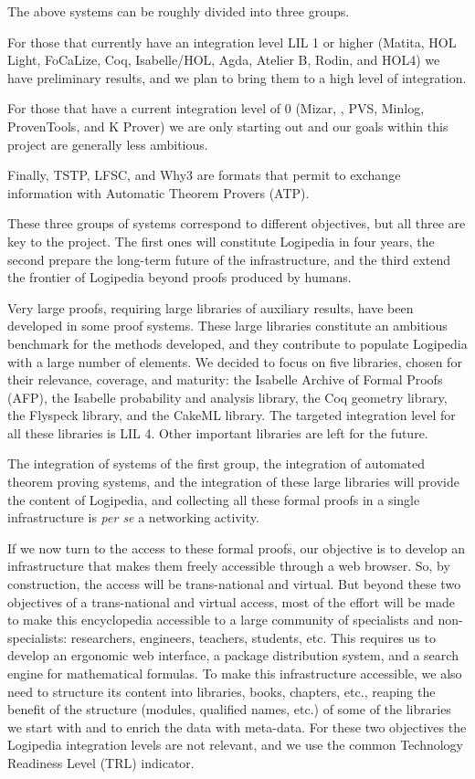 The above systems can be roughly divided into three groups.
\begin{compactitem}
\item For those
that currently have an integration level LIL 1 or higher (Matita, HOL
Light, FoCaLize, Coq, Isabelle/HOL, Agda, Atelier B, Rodin, and HOL4)
we have preliminary results, and we plan to bring them to a high level
of integration.
\item For those that have a current integration level of 0
(Mizar, \tlaplus, PVS, Minlog, ProvenTools, and K Prover) we are only
starting out and our goals within this project are generally less
ambitious.
\item Finally, TSTP, LFSC, and Why3 are formats that permit
to exchange information with Automatic Theorem Provers (ATP).
\end{compactitem}
These three groups of systems correspond to different
objectives, but all three are key to the project. The first ones will
constitute Logipedia in four years, the second prepare the
long-term future of the infrastructure, and the third extend the
frontier of Logipedia beyond proofs produced by humans.

Very large proofs, requiring large libraries of auxiliary results,
have been developed in some proof systems. These large libraries
constitute an ambitious benchmark for the methods developed, and they
contribute to populate Logipedia with a large number of elements.  We
decided to focus on five libraries, chosen for their relevance,
coverage, and maturity: the Isabelle Archive of Formal Proofs (AFP),
the Isabelle probability and analysis library, the Coq geometry
library, the Flyspeck library, and the CakeML library. The targeted
integration level for all these libraries is LIL 4. Other important
libraries are left for the future.

The integration of systems of the first group, the integration of
automated theorem proving systems, and the integration of these large
libraries will provide the content of Logipedia, and collecting all
these formal proofs in a single infrastructure is {\em per se} a
networking activity.

If we now turn to the access to these formal proofs, our objective is
to develop an infrastructure that makes them freely accessible through
a web browser. So, by construction, the access will be trans-national
and virtual. But beyond these two objectives of a trans-national and
virtual access, most of the effort will be made to make this
encyclopedia accessible to a large community of specialists and
non-specialists: researchers, engineers, teachers, students, etc.
This requires us to develop an ergonomic web interface, a package
distribution system, and a search engine for mathematical formulas.
To make this infrastructure accessible, we also need to structure its
content into libraries, books, chapters, etc., reaping the benefit of
the structure (modules, qualified names, etc.) of some of the
libraries we start with and to enrich the data with meta-data.
For these two objectives the Logipedia integration levels are not
relevant, and we use the common Technology Readiness Level (TRL) indicator.

